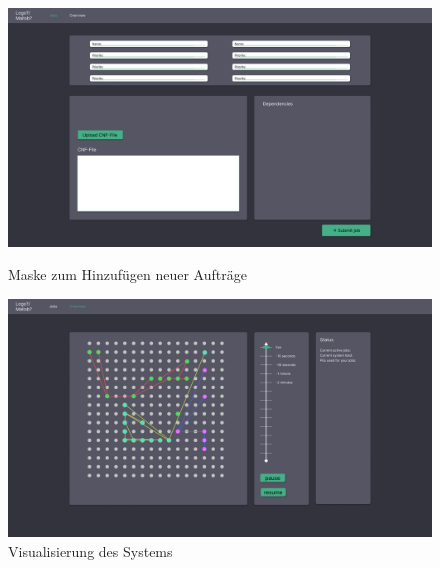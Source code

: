 \begin{figure}[H]
    \centering
    \includegraphics[width=\textwidth]{images-interface/Submit-Filev1.png}
    \caption{Maske zum Hinzufügen neuer Aufträge}
    \label{fig:addjobs}
     \includegraphics[width=\textwidth]{images-interface/overviewv1.png}
    \caption{Visualisierung des Systems}
    \label{fig:visualsn}
\end{figure}


